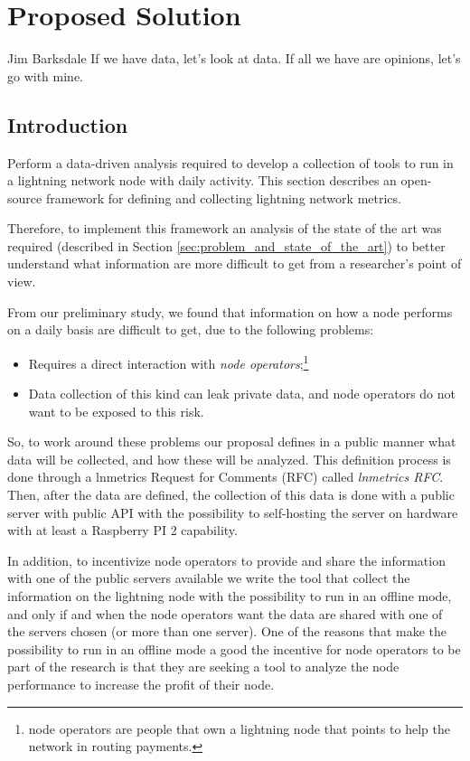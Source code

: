 \chapter{Proposed Solution}

\begin{chapquote}{Jim Barksdale}
If we have data, let’s look at data. If all we have are opinions, let’s go with mine.
\end{chapquote}

\section{Introduction}

Perform a data-driven analysis required to develop a collection of tools
to run in a lightning network node with daily activity. 
This section describes an open-source framework for defining and collecting
lightning network metrics.

Therefore, to implement this framework an analysis of the state 
of the art was required (described in Section \ref{sec:problem_and_state_of_the_art})
to better understand what information are more difficult 
to get from a researcher's point of view.

From our preliminary study, we found that information on how a node performs 
on a daily basis are difficult to get, due to the following problems:
\begin{itemize}
    \item Requires a direct interaction with \emph{node operators};\footnote{node operators are people that own a 
        lightning node that points to help the network in routing payments.}
    \item Data collection of this kind can leak private data, and node operators
        do not want to be exposed to this risk.
\end{itemize}

So, to work around these problems our proposal defines in a 
public manner what data will be collected, and how these will be analyzed. This 
definition process is done through a lnmetrics Request for Comments (RFC) 
called \emph{lnmetrics RFC}. Then, after the data are defined, the collection 
of this data is done with a public server with public API with the possibility 
to self-hosting the server on hardware with at least a Raspberry PI 2 capability.

In addition, to incentivize node operators to provide and share the 
information with one of the public servers available we write the tool that 
collect the information on the lightning node with the possibility to run 
in an offline mode, and only if and when the node operators want the data 
are shared with one of the servers chosen (or more than one server).
One of the reasons that make the possibility to run in an offline mode a good
the incentive for node operators to be part of the research is that they 
are seeking a tool to analyze the node performance to increase the profit of
their node.

